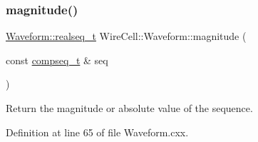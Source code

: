 \subsubsection{\texorpdfstring{magnitude()}{magnitude()}}
{\footnotesize\ttfamily \hyperlink{namespace_wire_cell_1_1_waveform_a479175e541c8545e87cd8063b74b6956}{Waveform\+::realseq\+\_\+t} Wire\+Cell\+::\+Waveform\+::magnitude (\begin{DoxyParamCaption}\item[{const \hyperlink{namespace_wire_cell_1_1_waveform_a7e4a8d371f774438bb360e7d1dcb583a}{compseq\+\_\+t} \&}]{seq }\end{DoxyParamCaption})}



Return the magnitude or absolute value of the sequence. 



Definition at line 65 of file Waveform.\+cxx.

